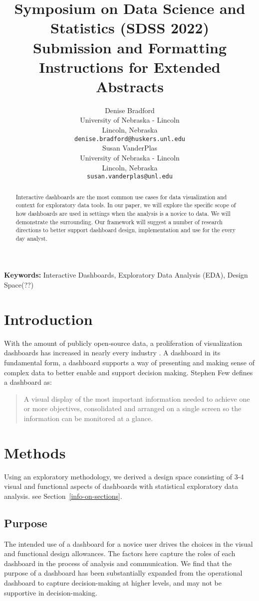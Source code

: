 \documentclass[10pt]{article}
\title{Symposium on Data Science and Statistics (SDSS 2022) \\
Submission and Formatting Instructions for Extended Abstracts}
\author{
  Denise Bradford \\
  University of Nebraska - Lincoln \\
  Lincoln, Nebraska \\
  {\tt denise.bradford@huskers.unl.edu} \\\And
  Susan VanderPlas \\
  University of Nebraska - Lincoln \\
  Lincoln, Nebraska \\
  {\tt susan.vanderplas@unl.edu} \\}
\date{}
\begin{document}
\maketitle
\begin{abstract}
Interactive dashboards are the most common use cases for data visualization and context for exploratory data tools. In our paper, we will explore the specific scope of how dashboards are used in settings when the analysis is a novice to data. We will demonstrate the surrounding. Our framework will suggest a number of research directions to better support dashboard design, implementation and use for the every day analyst. 
\end{abstract}

{\bf Keywords:} Interactive Dashboards, Exploratory Data Analysis (EDA), Design Space(??)

\section{Introduction}
With the amount of publicly open-source data, a proliferation of visualization dashboards has increased in nearly every industry \cite{Fisher}. A dashboard in its fundamental form, a dashboard supports a way of presenting and making sense of complex data to better enable and support decision making. Stephen Few defines a dashboard as:
\begin{quotation}
\small A visual display of the most important information needed to achieve one or more objectives, consolidated and arranged on a single screen so the information can be monitored at a glance. \cite{Few}
\end{quotation}

\section{Methods}
Using an exploratory methodology, we derived a design space consisting of 3-4 visual and functional aspects of dashboards with statistical exploratory data analysis. see Section~\ref{info-on-sections}.

\subsection{Purpose}
The intended use of a dashboard for a novice user drives the choices in the visual and functional design allowances. The factors here capture the roles of each dashboard in the process of analysis and communication. We find that the purpose of a dashboard has been substantially expanded from the operational dashboard to capture decision-making at higher levels, and may not be supportive in decision-making.
\end{document}
